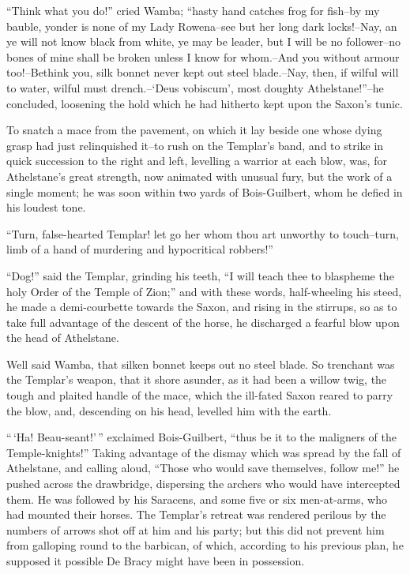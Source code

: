 ``Think what you do!'' cried Wamba; ``hasty hand catches frog for
fish--by my bauble, yonder is none of my Lady Rowena--see but her long
dark locks!--Nay, an ye will not know black from white, ye may be
leader, but I will be no follower--no bones of mine shall be broken
unless I know for whom.--And you without armour too!--Bethink you, silk
bonnet never kept out steel blade.--Nay, then, if wilful will to water,
wilful must drench.--`Deus vobiscum', most doughty Athelstane!''--he
concluded, loosening the hold which he had hitherto kept upon the
Saxon's tunic.

To snatch a mace from the pavement, on which it lay beside one whose
dying grasp had just relinquished it--to rush on the Templar's band, and
to strike in quick succession to the right and left, levelling a warrior
at each blow, was, for Athelstane's great strength, now animated with
unusual fury, but the work of a single moment; he was soon within two
yards of Bois-Guilbert, whom he defied in his loudest tone.

``Turn, false-hearted Templar! let go her whom thou art unworthy to
touch--turn, limb of a hand of murdering and hypocritical robbers!''

``Dog!'' said the Templar, grinding his teeth, ``I will teach thee to
blaspheme the holy Order of the Temple of Zion;'' and with these words,
half-wheeling his steed, he made a demi-courbette towards the Saxon, and
rising in the stirrups, so as to take full advantage of the descent of
the horse, he discharged a fearful blow upon the head of Athelstane.

Well said Wamba, that silken bonnet keeps out no steel blade. So
trenchant was the Templar's weapon, that it shore asunder, as it had
been a willow twig, the tough and plaited handle of the mace, which the
ill-fated Saxon reared to parry the blow, and, descending on his head,
levelled him with the earth.

``\,`Ha! Beau-seant!'\,'' exclaimed Bois-Guilbert, ``thus be it to the
maligners of the Temple-knights!'' Taking advantage of the dismay which
was spread by the fall of Athelstane, and calling aloud, ``Those who
would save themselves, follow me!'' he pushed across the drawbridge,
dispersing the archers who would have intercepted them. He was followed
by his Saracens, and some five or six men-at-arms, who had mounted their
horses. The Templar's retreat was rendered perilous by the numbers of
arrows shot off at him and his party; but this did not prevent him from
galloping round to the barbican, of which, according to his previous
plan, he supposed it possible De Bracy might have been in possession.

